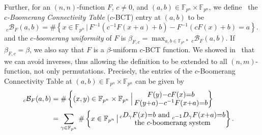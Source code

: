 \documentclass[11pt]{article}
\newcommand{\cB}{\mathscr{B}}
\def\cB{{\mathcal B}}
\def\F{{\mathbb F}}
\def\Fn{{\mathbb{F}_{p^n}}}
\def\\{\cr}
\newcommand{\cardinality}[1]{\# #1}
\begin{document}
Further, 
for an $(n,n)$-function $F$, $c\neq 0$, and $(a,b)\in\Fn\times \Fn$,  we define~\cite{S20} the {\em $c$-Boomerang Connectivity Table}  \textup{(}$c$-BCT\textup{)} entry at $(a,b)$ to be
{\small
\begin{equation*}
\label{eq:originalBCT}
  _c\cB_F(a,b)=\cardinality \left\{ x\in\Fn\,\Big|\,  F^{-1}(c^{-1} F(x+a)+b) -F^{-1}(cF(x)+b)=a \right\}.
\end{equation*}
}
and  the {\em $c$-boomerang uniformity} of $F$ is 
$\displaystyle
\beta_{F,c}=\max_{a,b\in\Fn*} {_c}\cB_F(a,b).
$
If $\beta_{F,c}=\beta$, we also say that $F$ is a $\beta$-uniform $c$-BCT function.
We showed in~\cite{S20} that we can avoid inverses, thus   allowing the definition to be extended to all $(n,m)$-function, not only permutations. Precisely,   the entries of the $c$-Boomerang Connectivity Table at $(a,b)\in\F_{p^n}\times\F_{p^n}$  can be given by
\begin{align*}
_c\cB_F(a,b)&=\cardinality \left\{ (x,y)\in\Fn\times \Fn\,\Big|\, \Large\substack{F(y)-cF(x) =b \\  F(y+a)- c^{-1} F(x+a)=b }  \right\}\\
& =\sum_{\gamma\in\Fn} \cardinality  \left\{ x \in\Fn \,\big|\, \Large \substack{_cD_\gamma F(x)=b \text{ and }  _{c^{-1}}D_\gamma F(x+a)=b \\
\text{the $c$-boomerang system}}  \right\}.
\end{align*}
  
  
  
\end{document}
